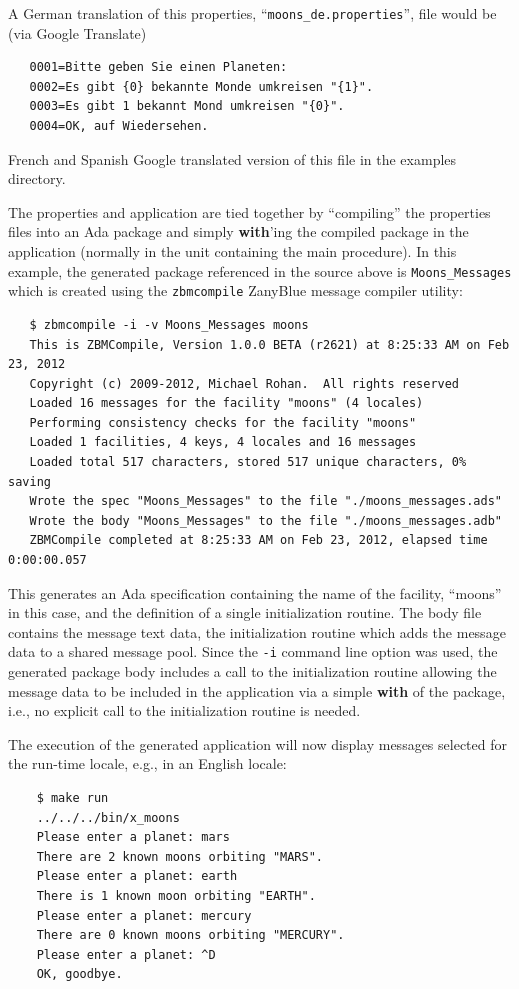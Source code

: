 A German translation of this properties, ``\texttt{moons\_de.properties}'',
file would be (via Google Translate)
\begin{small}
\begin{verbatim}
   0001=Bitte geben Sie einen Planeten:
   0002=Es gibt {0} bekannte Monde umkreisen "{1}".
   0003=Es gibt 1 bekannt Mond umkreisen "{0}".
   0004=OK, auf Wiedersehen.
\end{verbatim}
\end{small}
French and Spanish Google translated version of this file in the examples
directory.

The properties and application are tied together by ``compiling'' the
properties files into an Ada package and simply \textbf{with}'ing the
compiled package in the application (normally in the unit containing
the main procedure).  In this example, the generated package referenced
in the source above is \texttt{Moons\_Messages} which is created using
the \texttt{zbmcompile} ZanyBlue message compiler utility:
\begin{xmpl}
\begin{verbatim}
   $ zbmcompile -i -v Moons_Messages moons
   This is ZBMCompile, Version 1.0.0 BETA (r2621) at 8:25:33 AM on Feb 23, 2012
   Copyright (c) 2009-2012, Michael Rohan.  All rights reserved
   Loaded 16 messages for the facility "moons" (4 locales)
   Performing consistency checks for the facility "moons"
   Loaded 1 facilities, 4 keys, 4 locales and 16 messages
   Loaded total 517 characters, stored 517 unique characters, 0% saving
   Wrote the spec "Moons_Messages" to the file "./moons_messages.ads"
   Wrote the body "Moons_Messages" to the file "./moons_messages.adb"
   ZBMCompile completed at 8:25:33 AM on Feb 23, 2012, elapsed time 0:00:00.057
\end{verbatim}
\end{xmpl}

This generates an Ada specification containing the name of the facility,
``moons'' in this case, and the definition of a single initialization routine.
The body file contains the message text data, the initialization routine which
adds the message data to a shared message pool.  Since the \texttt{-i}
command line option was used, the generated package body includes a call
to the initialization routine allowing the message data to be included
in the application via a simple \textbf{with} of the package, i.e., no
explicit call to the initialization routine is needed.

The execution of the generated application will now display messages selected
for the run-time locale, e.g., in an English locale:
\begin{xmpl}
\begin{verbatim}
    $ make run
    ../../../bin/x_moons
    Please enter a planet: mars
    There are 2 known moons orbiting "MARS".
    Please enter a planet: earth
    There is 1 known moon orbiting "EARTH".
    Please enter a planet: mercury
    There are 0 known moons orbiting "MERCURY".
    Please enter a planet: ^D
    OK, goodbye.
\end{verbatim}
\end{xmpl}

